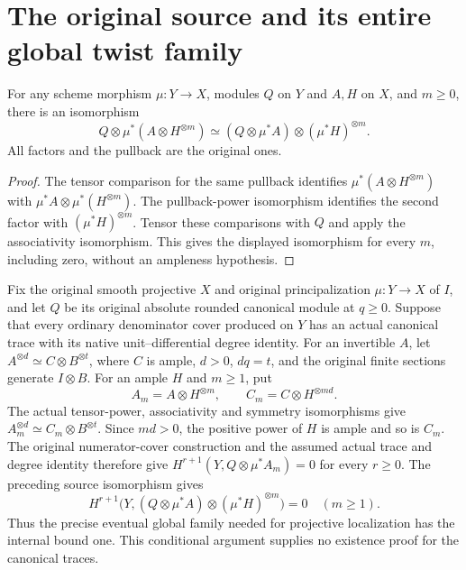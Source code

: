 \section{The original source and its entire global twist family}

\begin{lemma}
\label{lem:kn-original-rounded-source-twist-isomorphism}
\leanok
For any scheme morphism $\mu:Y\to X$, modules $Q$ on $Y$ and $A,H$
on $X$, and $m\geq0$, there is an isomorphism
\[
 Q\otimes\mu^*(A\otimes H^{\otimes m})
 \simeq (Q\otimes\mu^*A)\otimes(\mu^*H)^{\otimes m}.
\]
All factors and the pullback are the original ones.
\end{lemma}
\begin{proof}
The tensor comparison for the same pullback identifies
$\mu^*(A\otimes H^{\otimes m})$ with
$\mu^*A\otimes\mu^*(H^{\otimes m})$.
The pullback-power isomorphism identifies the second factor with
$(\mu^*H)^{\otimes m}$. Tensor these comparisons with $Q$ and apply
the associativity isomorphism. This gives the displayed isomorphism
for every $m$, including zero, without an ampleness hypothesis.
\end{proof}

\begin{remark}
Fix the original smooth projective $X$ and original principalization
$\mu:Y\to X$ of $I$, and let $Q$ be its original absolute rounded
canonical module at $q\geq0$. Suppose that every ordinary denominator
cover produced on $Y$ has an actual canonical trace with its native
unit--differential degree identity. For an invertible $A$, let
$A^{\otimes d}\simeq C\otimes B^{\otimes t}$, where $C$ is ample,
$d>0$, $dq=t$, and the original finite sections generate $I\otimes B$.
For an ample $H$ and $m\geq1$, put
\[
 A_m=A\otimes H^{\otimes m},\qquad
 C_m=C\otimes H^{\otimes md}.
\]
The actual tensor-power, associativity and symmetry isomorphisms give
$A_m^{\otimes d}\simeq C_m\otimes B^{\otimes t}$.
Since $md>0$, the positive power of $H$ is ample and so is $C_m$.
The original numerator-cover construction and the assumed actual
trace and degree identity therefore give
$H^{r+1}(Y,Q\otimes\mu^*A_m)=0$ for every $r\geq0$.
The preceding source isomorphism gives
\[
 H^{r+1}\bigl(Y,(Q\otimes\mu^*A)\otimes
                 (\mu^*H)^{\otimes m}\bigr)=0
 \quad(m\geq1).
\]
Thus the precise eventual global family needed for projective
localization has the internal bound one. This conditional argument
supplies no existence proof for the canonical traces.
\end{remark}
